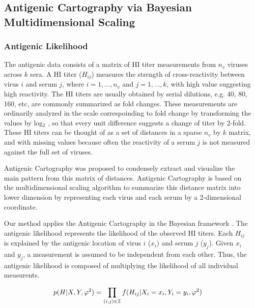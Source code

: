 \documentclass[11pt,oneside,letterpaper]{article}
\newcommand{\mdssd}{\varphi}						%
\begin{document}
\subsection*{Antigenic Cartography via Bayesian Multidimensional Scaling}



\subsubsection*{Antigenic Likelihood }


The antigenic data consists of a matrix of HI titer measurements from $n_v$ viruses across $k$ sera.  
A HI titer ($H_{ij}$) measures the strength of cross-reactivity between virus $i$ and serum $j$, where $i=1, ...,  n_v$ and $j=1,...,k$, with high value suggesting high reactivity. 
The HI titers are usually obtained by serial dilutions, e.g. 40, 80, 160, etc, are commonly summarized as fold changes. These measurements are ordinarily analyzed in the scale correspoinding to fold change by transforming the values by log$_2$ \cite{smith_mapping_2004, bedford_integrating_2014}, so that every unit difference suggests a change of titer by 2-fold. 
These HI titers can be thought of as a set of distances in a sparse $n_v$ by $k$ matrix, and with missing values because often the reactivity of a serum $j$ is not measured against the full set of viruses.
	
Antigenic Cartography was proposed \cite{smith_mapping_2004} to condensely extract and visualize the main pattern from this matrix of distances. 
Antigenic Cartography is based on the multidimensional scaling algorithm to summarize this distance matrix into lower dimension by representing each virus and each serum by a 2-dimensional coordinate. 

Our method applies the Antigenic Cartography in the Bayesian framework \cite{bedford_integrating_2014}. 
The antigenic likelihood represents the likelihood of the observed HI titers. 
Each $H_{ij}$ is explained by the antigenic location of virus $i$ ($x_i$) and serum $j$ ($y_j$). 
Given $x_i$ and $y_j$, a measurement is assumed to be independent from each other. 
Thus, the antigenic likelihood is composed of multiplying the likelihood of all individual measurents.

\begin{equation}
 p(H|X, Y, \mdssd^2) = \prod_{(i,j) \in \cal I} f(H_{ij} |  X_i  = x_i, Y_i = y_i,\mdssd^2) 
\end{equation}
\end{document}

